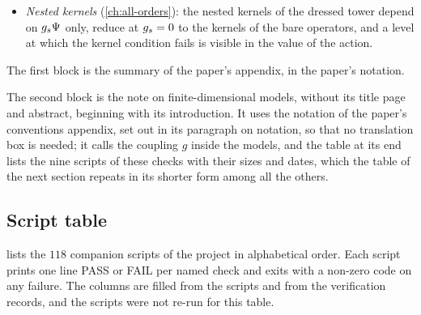 \begin{itemize}

  \item \emph{Nested kernels} (\cref{ch:all-orders}): the nested kernels of the dressed tower depend on $g_s \Psi$ only, reduce at $g_s = 0$ to the kernels of the bare operators, and a level at which the kernel condition fails is visible in the value of the action.

\end{itemize}

The first block is the summary of the paper's appendix, in the paper's notation.



The second block is the note on finite-dimensional models, without its title page and abstract, beginning with its introduction.
It uses the notation of the paper's conventions appendix, set out in its paragraph on notation, so that no translation box is needed; it calls the coupling $g$ inside the models, and the table at its end lists the nine scripts of these checks with their sizes and dates, which the table of the next section repeats in its shorter form among all the others.



\subsection{Script table}
\label{sec:fm:script-table}

 lists the $118$ companion scripts of the project in alphabetical order.
Each script prints one line PASS or FAIL per named check and exits with a non-zero code on any failure.
The columns are filled from the scripts and from the verification records, and the scripts were not re-run for this table.

